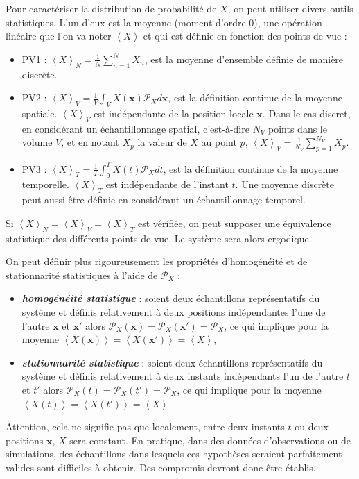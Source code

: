 Pour caractériser la distribution de probabilité de $X$, on peut utiliser divers outils statistiques. L'un d'eux est la moyenne (moment d'ordre 0), une opération linéaire que l'on va noter $\left< X \right>$ et qui est définie en fonction des points de vue :
\begin{itemize}
    \item PV1 : $\left<X\right>_{N} = \frac{1}{N} \sum_{n=1}^N X_n$, est la moyenne d'ensemble définie de manière discrète.
    \item PV2 : $\left<X\right>_{V} = \frac{1}{V} \int_V X(\mathbf{x}) \mathcal{P}_X d\mathbf{x}$, est la définition continue de la moyenne spatiale. $\left<X\right>_V$ est indépendante de la position locale $\mathbf{x}$. Dans le cas discret, en considérant un échantillonnage spatial, c'est-à-dire $N_V$ points dans le volume $V$, et en notant $X_p$ la valeur de $X$ au point $p$, $\left<X\right>_{V} = \frac{1}{N_V} \sum_{p=1}^{N_V} X_p$. 
    \item PV3 : $\left<X\right>_{T} = \frac{1}{T} \int_0^T X(t) \mathcal{P}_X dt$, est la définition continue de la moyenne temporelle. $\left<X\right>_T$ est indépendante de l'instant $t$. Une moyenne discrète peut aussi être définie en considérant un échantillonnage temporel.
\end{itemize}
Si $\left<X\right>_{N} = \left<X\right>_{V} = \left<X\right>_{T}$ est vérifiée, on peut supposer une équivalence statistique des différents points de vue. Le système sera alors ergodique. 

On peut définir plus rigoureusement les propriétés d'homogénéité et de stationnarité statistiques à l'aide de $\mathcal{P}_X$ : 
\begin{itemize}
    \item \textbf{\emph{homogénéité statistique}} : soient deux échantillons représentatifs du système et définis relativement à deux positions indépendantes l'une de l'autre $\mathbf{x}$ et $\mathbf{x'}$ alors  $\mathcal{P}_X(\mathbf{x}) = \mathcal{P}_X(\mathbf{x'}) = \mathcal{P}_X$, ce qui implique pour la moyenne $\left<X(\mathbf{x})\right> = \left<X(\mathbf{x'})\right> = \left<X\right>$,
    \item \textbf{\emph{stationnarité statistique}} : soient deux échantillons représentatifs du système et définis relativement à deux instants indépendants l'un de l'autre $t$ et $t'$ alors $\mathcal{P}_X(t) = \mathcal{P}_X(t') = \mathcal{P}_X$, ce qui implique pour la moyenne $\left<X(t)\right> = \left<X(t')\right> = \left<X\right>$.
\end{itemize}
Attention, cela ne signifie pas que localement, entre deux instants $t$ ou deux positions $\mathbf{x}$, $X$ sera constant. En pratique, dans des données d'observations ou de simulations, des échantillons dans lesquels ces hypothèses seraient parfaitement valides sont difficiles à obtenir. Des compromis devront donc être établis. 

